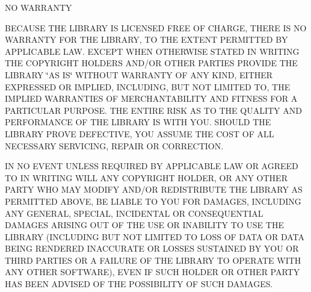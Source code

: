 N\+O W\+A\+R\+R\+A\+N\+T\+Y


\begin{DoxyEnumerate}
\item B\+E\+C\+A\+U\+S\+E T\+H\+E L\+I\+B\+R\+A\+R\+Y I\+S L\+I\+C\+E\+N\+S\+E\+D F\+R\+E\+E O\+F C\+H\+A\+R\+G\+E, T\+H\+E\+R\+E I\+S N\+O W\+A\+R\+R\+A\+N\+T\+Y F\+O\+R T\+H\+E L\+I\+B\+R\+A\+R\+Y, T\+O T\+H\+E E\+X\+T\+E\+N\+T P\+E\+R\+M\+I\+T\+T\+E\+D B\+Y A\+P\+P\+L\+I\+C\+A\+B\+L\+E L\+A\+W. E\+X\+C\+E\+P\+T W\+H\+E\+N O\+T\+H\+E\+R\+W\+I\+S\+E S\+T\+A\+T\+E\+D I\+N W\+R\+I\+T\+I\+N\+G T\+H\+E C\+O\+P\+Y\+R\+I\+G\+H\+T H\+O\+L\+D\+E\+R\+S A\+N\+D/\+O\+R O\+T\+H\+E\+R P\+A\+R\+T\+I\+E\+S P\+R\+O\+V\+I\+D\+E T\+H\+E L\+I\+B\+R\+A\+R\+Y \char`\"{}\+A\+S I\+S\char`\"{} W\+I\+T\+H\+O\+U\+T W\+A\+R\+R\+A\+N\+T\+Y O\+F A\+N\+Y K\+I\+N\+D, E\+I\+T\+H\+E\+R E\+X\+P\+R\+E\+S\+S\+E\+D O\+R I\+M\+P\+L\+I\+E\+D, I\+N\+C\+L\+U\+D\+I\+N\+G, B\+U\+T N\+O\+T L\+I\+M\+I\+T\+E\+D T\+O, T\+H\+E I\+M\+P\+L\+I\+E\+D W\+A\+R\+R\+A\+N\+T\+I\+E\+S O\+F M\+E\+R\+C\+H\+A\+N\+T\+A\+B\+I\+L\+I\+T\+Y A\+N\+D F\+I\+T\+N\+E\+S\+S F\+O\+R A P\+A\+R\+T\+I\+C\+U\+L\+A\+R P\+U\+R\+P\+O\+S\+E. T\+H\+E E\+N\+T\+I\+R\+E R\+I\+S\+K A\+S T\+O T\+H\+E Q\+U\+A\+L\+I\+T\+Y A\+N\+D P\+E\+R\+F\+O\+R\+M\+A\+N\+C\+E O\+F T\+H\+E L\+I\+B\+R\+A\+R\+Y I\+S W\+I\+T\+H Y\+O\+U. S\+H\+O\+U\+L\+D T\+H\+E L\+I\+B\+R\+A\+R\+Y P\+R\+O\+V\+E D\+E\+F\+E\+C\+T\+I\+V\+E, Y\+O\+U A\+S\+S\+U\+M\+E T\+H\+E C\+O\+S\+T O\+F A\+L\+L N\+E\+C\+E\+S\+S\+A\+R\+Y S\+E\+R\+V\+I\+C\+I\+N\+G, R\+E\+P\+A\+I\+R O\+R C\+O\+R\+R\+E\+C\+T\+I\+O\+N.
\item I\+N N\+O E\+V\+E\+N\+T U\+N\+L\+E\+S\+S R\+E\+Q\+U\+I\+R\+E\+D B\+Y A\+P\+P\+L\+I\+C\+A\+B\+L\+E L\+A\+W O\+R A\+G\+R\+E\+E\+D T\+O I\+N W\+R\+I\+T\+I\+N\+G W\+I\+L\+L A\+N\+Y C\+O\+P\+Y\+R\+I\+G\+H\+T H\+O\+L\+D\+E\+R, O\+R A\+N\+Y O\+T\+H\+E\+R P\+A\+R\+T\+Y W\+H\+O M\+A\+Y M\+O\+D\+I\+F\+Y A\+N\+D/\+O\+R R\+E\+D\+I\+S\+T\+R\+I\+B\+U\+T\+E T\+H\+E L\+I\+B\+R\+A\+R\+Y A\+S P\+E\+R\+M\+I\+T\+T\+E\+D A\+B\+O\+V\+E, B\+E L\+I\+A\+B\+L\+E T\+O Y\+O\+U F\+O\+R D\+A\+M\+A\+G\+E\+S, I\+N\+C\+L\+U\+D\+I\+N\+G A\+N\+Y G\+E\+N\+E\+R\+A\+L, S\+P\+E\+C\+I\+A\+L, I\+N\+C\+I\+D\+E\+N\+T\+A\+L O\+R C\+O\+N\+S\+E\+Q\+U\+E\+N\+T\+I\+A\+L D\+A\+M\+A\+G\+E\+S A\+R\+I\+S\+I\+N\+G O\+U\+T O\+F T\+H\+E U\+S\+E O\+R I\+N\+A\+B\+I\+L\+I\+T\+Y T\+O U\+S\+E T\+H\+E L\+I\+B\+R\+A\+R\+Y (I\+N\+C\+L\+U\+D\+I\+N\+G B\+U\+T N\+O\+T L\+I\+M\+I\+T\+E\+D T\+O L\+O\+S\+S O\+F D\+A\+T\+A O\+R D\+A\+T\+A B\+E\+I\+N\+G R\+E\+N\+D\+E\+R\+E\+D I\+N\+A\+C\+C\+U\+R\+A\+T\+E O\+R L\+O\+S\+S\+E\+S S\+U\+S\+T\+A\+I\+N\+E\+D B\+Y Y\+O\+U O\+R T\+H\+I\+R\+D P\+A\+R\+T\+I\+E\+S O\+R A F\+A\+I\+L\+U\+R\+E O\+F T\+H\+E L\+I\+B\+R\+A\+R\+Y T\+O O\+P\+E\+R\+A\+T\+E W\+I\+T\+H A\+N\+Y O\+T\+H\+E\+R S\+O\+F\+T\+W\+A\+R\+E), E\+V\+E\+N I\+F S\+U\+C\+H H\+O\+L\+D\+E\+R O\+R O\+T\+H\+E\+R P\+A\+R\+T\+Y H\+A\+S B\+E\+E\+N A\+D\+V\+I\+S\+E\+D O\+F T\+H\+E P\+O\+S\+S\+I\+B\+I\+L\+I\+T\+Y O\+F S\+U\+C\+H D\+A\+M\+A\+G\+E\+S.
\end{DoxyEnumerate}

